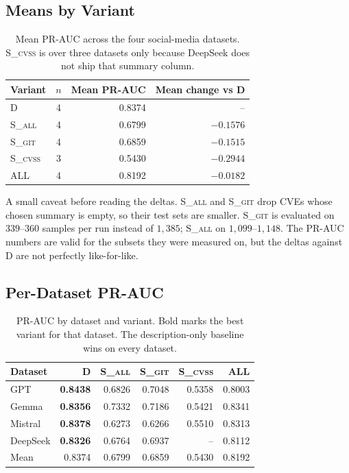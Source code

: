 \documentclass[11pt]{article}
\begin{document}
\normalsize

\subsection{Means by Variant}

\begin{table}[h]
\centering
\small
\begin{tabular}{lcrr}
\toprule
Variant & $n$ & Mean PR-AUC & Mean change vs \textsc{D} \\
\midrule
\textsc{D}      & 4 & 0.8374 & --       \\
\textsc{S\_all} & 4 & 0.6799 & $-0.1576$ \\
\textsc{S\_git} & 4 & 0.6859 & $-0.1515$ \\
\textsc{S\_cvss}& 3 & 0.5430 & $-0.2944$ \\
\textsc{ALL}    & 4 & 0.8192 & $-0.0182$ \\
\bottomrule
\end{tabular}
\caption{Mean PR-AUC across the four social-media datasets.
\textsc{S\_cvss} is over three datasets only because DeepSeek does
not ship that summary column.}
\end{table}

A small caveat before reading the deltas. \textsc{S\_all} and
\textsc{S\_git} drop CVEs whose chosen summary is empty, so their test
sets are smaller. \textsc{S\_git} is evaluated on $339$--$360$ samples
per run instead of $1{,}385$; \textsc{S\_all} on $1{,}099$--$1{,}148$.
The PR-AUC numbers are valid for the subsets they were measured on,
but the deltas against \textsc{D} are not perfectly like-for-like.

\subsection{Per-Dataset PR-AUC}

\begin{table}[h]
\centering
\small
\begin{tabular}{lrrrrr}
\toprule
Dataset & \textsc{D} & \textsc{S\_all} & \textsc{S\_git} & \textsc{S\_cvss} & \textsc{ALL} \\
\midrule
GPT      & \textbf{0.8438} & 0.6826 & 0.7048 & 0.5358 & 0.8003 \\
Gemma    & \textbf{0.8356} & 0.7332 & 0.7186 & 0.5421 & 0.8341 \\
Mistral  & \textbf{0.8378} & 0.6273 & 0.6266 & 0.5510 & 0.8313 \\
DeepSeek & \textbf{0.8326} & 0.6764 & 0.6937 & --     & 0.8112 \\
\midrule
Mean     & 0.8374          & 0.6799 & 0.6859 & 0.5430 & 0.8192 \\
\bottomrule
\end{tabular}
\caption{PR-AUC by dataset and variant. Bold marks the best variant
for that dataset. The description-only baseline wins on every dataset.}
\end{table}
\end{document}
